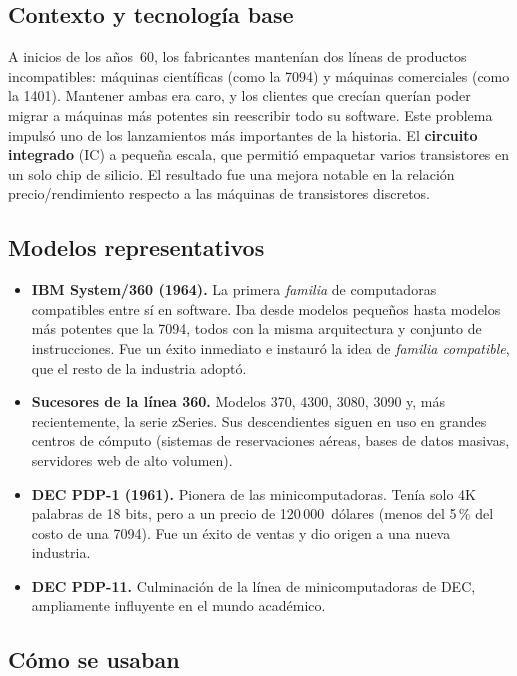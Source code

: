 \documentclass[10pt,letterpaper,twocolumn]{article}
\begin{document}
\subsection{Contexto y tecnología base}

A inicios de los años~60, los fabricantes mantenían dos líneas de
productos incompatibles: máquinas científicas (como la 7094) y máquinas
comerciales (como la 1401). Mantener ambas era caro, y los clientes que
crecían querían poder migrar a máquinas más potentes sin reescribir todo
su software. Este problema impulsó uno de los lanzamientos más
importantes de la historia. El \textbf{circuito integrado} (IC) a pequeña
escala, que permitió empaquetar varios transistores en un solo chip de
silicio. El resultado fue una mejora notable en la relación
precio/rendimiento respecto a las máquinas de transistores discretos.

\subsection{Modelos representativos}

\begin{itemize}[leftmargin=*,itemsep=0.2em]
  \item \textbf{IBM System/360 (1964).} La primera \emph{familia} de
    computadoras compatibles entre sí en software. Iba desde modelos
    pequeños hasta modelos más potentes que la 7094, todos con la
    misma arquitectura y conjunto de instrucciones. Fue un éxito inmediato e
    instauró la idea de \emph{familia compatible}, que el resto de la
    industria adoptó.
  \item \textbf{Sucesores de la línea 360.} Modelos 370, 4300, 3080,
    3090 y, más recientemente, la serie zSeries. Sus descendientes
    siguen en uso en grandes centros de cómputo (sistemas de
    reservaciones aéreas, bases de datos masivas, servidores web de
    alto volumen).
  \item \textbf{DEC PDP-1 (1961).} Pionera de las minicomputadoras. 
    Tenía solo 4K palabras de 18 bits, pero
    a un precio de 120{\,}000~dólares (menos del 5\,\% del costo de
    una 7094). Fue un éxito de ventas y dio origen a una nueva
    industria.
  \item \textbf{DEC PDP-11.} Culminación de la línea de
    minicomputadoras de DEC, ampliamente influyente en el mundo
    académico.
\end{itemize}

\subsection{Cómo se usaban}
\end{document}
